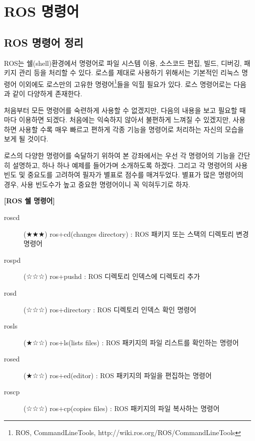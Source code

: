 

\chapter{ROS 명령어}

\section{ROS 명령어 정리}

ROS는 쉘(shell)환경에서 명령어로 파일 시스템 이용, 소스코드 편집, 빌드, 디버깅, 패키지 관리 등을 처리할 수 있다. 로스를 제대로 사용하기 위해서는 기본적인 리눅스 명령어 이외에도 로스만의 고유한 명령어\footnote{ROS, CommandLineTools, http://wiki.ros.org/ROS/CommandLineTools}들을 익힐 필요가 있다. 로스 명령어로는 다음과 같이 다양하게 존재한다. 

처음부터 모든 명령어를 숙련하게 사용할 수 없겠지만, 다음의 내용을 보고 필요할 때마다 이용하면 되겠다. 처음에는 익숙하지 않아서 불편하게 느껴질 수 있겠지만, 사용하면 사용할 수록 매우 빠르고 편하게 각종 기능을 명령어로 처리하는 자신의 모습을 보게 될 것이다.

로스의 다양한 명령어를 숙달하기 위하여 본 강좌에서는 우선 각 명령어의 기능을 간단히 설명하고, 하나 하나 예제를 들어가며 소개하도록 하겠다. 그리고 각 명령어의 사용 빈도 및 중요도를 고려하여 필자가 별표로 점수를 매겨두었다. 별표가 많은 명령어의 경우, 사용 빈도수가 높고 중요한 명령어이니 꼭 익혀두기로 하자.

\vspace{\baselineskip}
\noindent
\textbf{[ROS 쉘 명령어]}
\begin{description}
\item[roscd] (★★★) ros+cd(changes directory) : ROS 패키지 또는 스택의 디렉토리 변경 명령어
\item[rospd] (☆☆☆) ros+pushd : ROS 디렉토리 인덱스에 디렉토리 추가
\item[rosd] (☆☆☆) ros+directory : ROS 디렉토리 인덱스 확인 명령어
\item[rosls] (★☆☆) ros+ls(lists files) : ROS 패키지의 파일 리스트를 확인하는 명령어
\item[rosed] (★☆☆) ros+ed(editor) : ROS 패키지의 파일을 편집하는 명령어
\item[roscp] (☆☆☆) ros+cp(copies files) : ROS 패키지의 파일 복사하는 명령어
\end{description}

